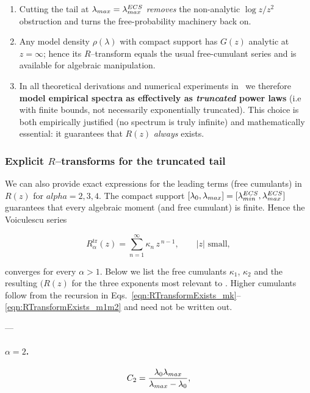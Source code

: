 \begin{enumerate}
\item Cutting the tail at $\lambda_{max}=\lambda^{ECS}_{max}$ \emph{removes} the non-analytic
  $\log z/z^{2}$ obstruction and turns the free-probability machinery back
  on.
\item Any model density $\rho(\lambda)$ with compact support has $G(z)$ analytic at
  $z=\infty$; hence its $R$–transform equals the usual free-cumulant
  series and is available for algebraic manipulation.
\item In all theoretical derivations and numerical experiments in
  \SETOL\ we therefore \textbf{model empirical spectra as effectively as \emph{truncated}
  power laws} (i.e with finite bounds, not necessarily exponentially truncated).
  This choice is both empirically justified (no spectrum is truly
  infinite) and mathematically essential: it guarantees that $R(z)$
  \emph{always} exists.
\end{enumerate}


\subsubsection{Explicit \texorpdfstring{$R$}{R}–transforms for the truncated tail}
\label{sxn:RTransformExists:explicit}

We can also provide exact expressions for the leading terms (free cumulants) in $R(z)$ for $alpha=2,3,4$.
The compact support $[\lambda_{0},\lambda_{max}]=[\lambda^{ECS}_{min},\lambda^{ECS}_{max}]$ guarantees that every
algebraic moment (and free cumulant) is finite. Hence the Voiculescu series 

\begin{equation}
R_{\alpha}^{\mathrm{tr}}(z)=
\sum_{n=1}^{\infty}\kappa_{n}\,z^{\,n-1},
\qquad |z|\text{ small},
\end{equation}

\noindent converges for every $\alpha>1$.  
Below we list the free cumulants $\kappa_{1}$, $\kappa_{2}$ and the resulting
$(R(z)$ for the three exponents most relevant to \SETOL.
Higher cumulants follow from the recursion in
Eqs.~\eqref{eqn:RTransformExists_mk}–\eqref{eqn:RTransformExists_m1m2} and
need not be written out.

---

\paragraph{$\alpha = 2$.}

\begin{equation}
C_{2}=\frac{\lambda_{0}\lambda_{max}}{\lambda_{max}-\lambda_{0}},
\end{equation}

